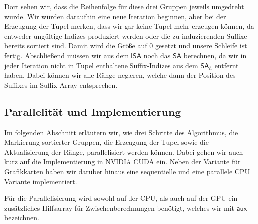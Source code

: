 Dort sehen wir, dass die Reihenfolge für diese drei Gruppen jeweils umgedreht wurde. Wir würden daraufhin eine neue Iteration beginnen, aber bei der Erzeugung der Tupel merken, dass wir gar keine Tupel mehr erzeugen können, da entweder ungültige Indizes produziert werden oder die zu induzierenden Suffixe bereits sortiert sind. Damit wird die Größe auf 0 gesetzt und unsere Schleife ist fertig. Abschließend müssen wir aus dem $\mathsf{ISA}$ noch das $\mathsf{SA}$ berechnen, da wir in jeder Iteration nicht in Tupel enthaltene Suffix-Indizes aus dem $\mathsf{SA}_h$ entfernt haben. Dabei können wir alle Ränge negieren, welche dann der Position des Suffixes im Suffix-Array entsprechen.


\subsection{Parallelität und Implementierung}
Im folgenden Abschnitt erläutern wir, wie drei Schritte des Algorithmus, die Markierung sortierter Gruppen, die Erzeugung der Tupel sowie die Aktualisierung der Ränge, parallelisiert werden können. Dabei gehen wir auch kurz auf die Implementierung in NVIDIA CUDA ein. Neben der Variante für Grafikkarten haben wir darüber hinaus eine sequentielle und eine parallele CPU Variante implementiert.

Für die Parallelisierung wird sowohl auf der CPU, als auch auf der GPU ein zusätzliches Hilfsarray für Zwischenberechnungen benötigt, welches wir mit $\mathsf{aux}$ bezeichnen.


